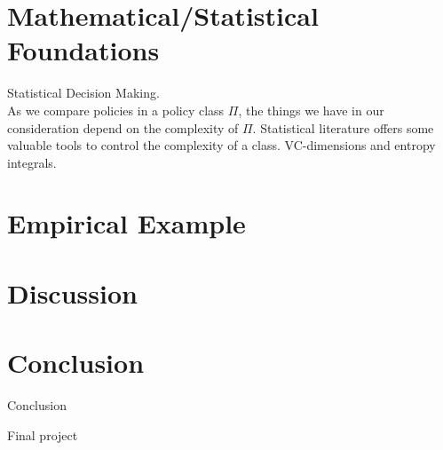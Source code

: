 \documentclass[11pt]{article}
\begin{document}
	\section{Mathematical/Statistical Foundations}
Statistical Decision Making.\\

As we compare policies in a policy class $\Pi$, the things we have in our consideration depend on the complexity of $\Pi$. Statistical literature offers some valuable tools to control the complexity of a class.
VC-dimensions and entropy integrals.	

\section{Empirical Example}

	\section{Discussion}
	
	\section{Conclusion}
	Conclusion
	
	Final project
	
	
	
	
	
\end{document}
